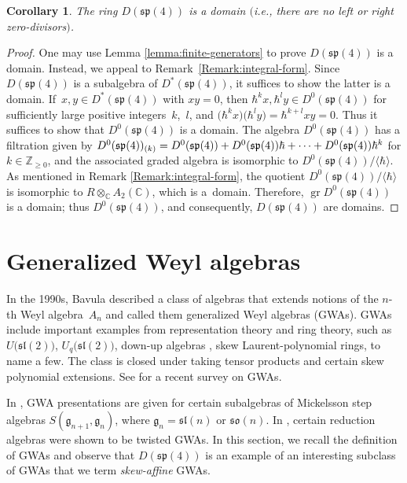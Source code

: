 \documentclass[10pt,a4paper]{amsart}
\numberwithin{equation}{section}
\newtheorem{Corollary}[Theorem]{Corollary}
\begin{document}
\begin{Corollary}\label{cor:Dsp4-structure:domain}
	The ring $D(\mathfrak{sp}(4))$ is a domain $($i.e., there are no left or right zero-divisors$)$.
\end{Corollary}

\begin{proof}
	One may use Lemma \ref{lemma:finite-generators}
	to prove $D(\mathfrak{sp}(4))$ is a domain.
	Instead, we appeal to Remark~\ref{Remark:integral-form}.
	Since $D(\mathfrak{sp}(4))$ is a subalgebra of $D^\ast(\mathfrak{sp}(4))$, it suffices to show the latter is a domain.
	If~${x,y\in D^\ast(\mathfrak{sp}(4))}$ with $xy=0$, then $\hbar^kx, \hbar^ly \in D^0(\mathfrak{sp}(4))$ for sufficiently large positive integers~$k$,~$l$, and $\bigl(\hbar^kx\bigr)\bigl(\hbar^ly\bigr)=\hbar^{k+l}xy=0$. Thus it suffices to show that $D^0(\mathfrak{sp}(4))$ is a domain.
	The algebra $D^0(\mathfrak{sp}(4))$ has a filtration given by $\smash{D^0(\mathfrak{sp}(4))_{(k)}=D^0(\mathfrak{sp}(4))+D^0(\mathfrak{sp}(4))\hbar}+\cdots+D^0(\mathfrak{sp}(4))\hbar^k$ for $k\in\mathbb{Z}_{\geq 0}$, and the associated graded algebra is isomorphic to $D^0(\mathfrak{sp}(4))/\langle\hbar\rangle$. As mentioned in
	Remark \ref{Remark:integral-form}, the quotient $D^0(\mathfrak{sp}(4))/\langle\hbar\rangle$ is isomorphic to $R\otimes_\mathbb{C} A_2(\mathbb{C})$, which is a~domain. Therefore, $\operatorname{gr}D^0(\mathfrak{sp}(4))$ is a domain; thus $D^0(\mathfrak{sp}(4))$, and consequently, $D(\mathfrak{sp}(4))$ are domains.
\end{proof}


\section{Generalized Weyl algebras}\label{sec:GWA}
In the 1990s, Bavula \cite{bavula1992generalized} described a class of algebras that extends notions of the $n$-th Weyl algebra~$A_{n}$ and called them generalized Weyl algebras (GWAs).
GWAs include important examples from representation theory and ring theory, such as $U\big(\mathfrak{sl}(2)\big)$, $U_q\big(\mathfrak{sl}(2)\big)$, down-up algebras \cite{benkartAlgebras1998}, skew Laurent-polynomial rings, to name a few. The class is closed under taking tensor products and certain skew polynomial extensions.
See \cite{gaddisWeylAlgebraIts2023} for a recent survey on GWAs.

In \cite{van1976harisch}, GWA presentations are given for certain subalgebras of Mickelsson step algebras $S(\mathfrak{g}_{n+1},\mathfrak{g}_n)$, where $\mathfrak{g}_n=\mathfrak{sl}(n)$ or $\mathfrak{so}(n)$. In \cite{mazorchukAssociativeAlgebrasRelated2003}, certain reduction algebras were shown to be twisted GWAs. In this section, we recall the definition of GWAs and observe that $D(\mathfrak{sp}(4))$
is an example of an interesting subclass of GWAs that we term \emph{skew-affine} GWAs.
\end{document}

